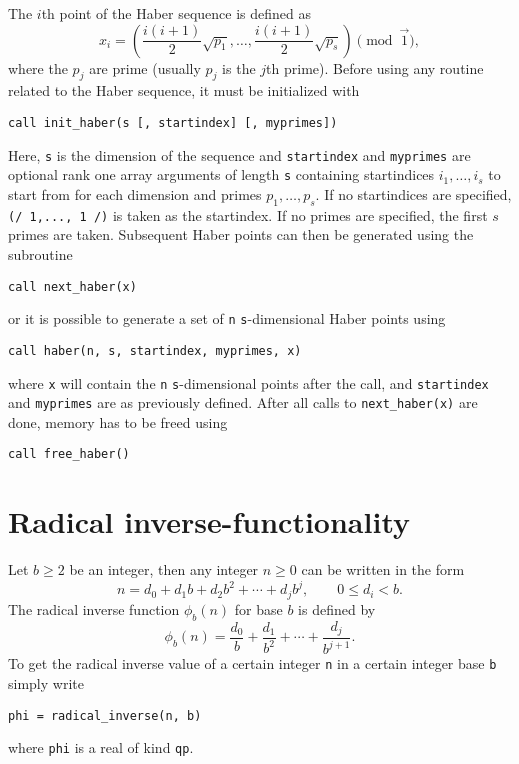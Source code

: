The $i$th point of the Haber sequence \cite{shaw88, fang94wang} is defined as
\[
x_i = \left( \frac{i(i+1)}{2}\sqrt{p_1},\ldots, \frac{i(i+1)}{2}\sqrt{p_s}
\right) \pmod{\vec{1}},
\]
where the $p_j$ are prime (usually $p_j$ is the $j$th prime).  Before using any routine related to the Haber sequence, it must be initialized
with
\begin{lstlisting}
call init_haber(s [, startindex] [, myprimes])
\end{lstlisting}
Here, \verb!s! is the dimension of the sequence and \verb!startindex! and
\verb!myprimes! are optional rank one
array arguments of length \verb!s! containing startindices $i_1,\ldots,i_s$
to start from for each dimension and primes $p_1,\ldots,p_s$.  If no startindices are specified, \verb!(/ 1,..., 1 /)! is taken as the startindex.  If no primes are specified, the first $s$ primes are taken.
Subsequent Haber points can then be generated using the subroutine
\begin{lstlisting}
call next_haber(x)
\end{lstlisting}
or it is possible to generate a set of \verb!n! \verb!s!-dimensional Haber
points using
\begin{lstlisting}
call haber(n, s, startindex, myprimes, x)
\end{lstlisting}
where \verb!x! will contain the \verb!n! \verb!s!-dimensional points after the
call, and \verb!startindex! and \verb!myprimes! are as previously defined.
After all calls to \verb!next_haber(x)! are done, memory has to be freed
using
\begin{lstlisting}
call free_haber()
\end{lstlisting}

\section{Radical inverse-functionality}

Let $b \geq 2$ be an integer, then any integer $n \geq 0$ can be written in the form
\[
 n = d_0 + d_1b + d_2b^2 + \cdots + d_jb^j, \qquad 0 \leq d_i < b.
\]
The radical inverse function $\phi_b(n)$ for base $b$ is defined by
\begin{equation} \label{eq:radical_inverse_function}
\phi_b(n) = \frac{d_0}{b} + \frac{d_1}{b^2} + \cdots + \frac{d_j}{b^{j+1}}.
\end{equation}
To get the radical inverse value of a certain integer \verb!n! in a certain
integer base \verb!b! simply write
\begin{lstlisting}
phi = radical_inverse(n, b)
\end{lstlisting}
where \verb!phi! is a real of kind \verb!qp!.

